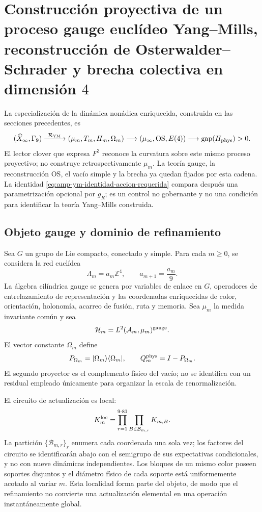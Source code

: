 \section[Proceso gauge euclídeo Yang--Mills en dimensión 4]{Construcción
proyectiva de un proceso gauge euclídeo Yang--Mills, reconstrucción de
Osterwalder--Schrader y brecha colectiva en dimensión \(4\)}


\noindent La especialización de la dinámica nonádica enriquecida,
construida en las secciones precedentes, es
\[
 (\widehat X_\infty,\Gamma_9)
 \xrightarrow{\ \mathcal R_{\rm YM}\ }
 (\mu_m,T_m,H_m,\Omega_m)
 \longrightarrow(\mu_\infty,\mathrm{OS},E(4))
 \longrightarrow\operatorname{gap}(H_{\rm phys})>0.
\]
El lector clover que expresa \(F^2\) reconoce la curvatura sobre este mismo
proceso proyectivo; no construye retrospectivamente \(\mu_m\). La teoría
gauge, la reconstrucción OS, el vacío simple y la brecha ya quedan fijados
por esta cadena. La identidad
\eqref{eq:amp-ym-identidad-accion-requerida} compara después una
parametrización opcional por \(g_R\); es un control no gobernante y no una
condición para identificar la teoría Yang--Mills construida.

\subsection*{Objeto gauge y dominio de refinamiento}

Sea \(G\) un grupo de Lie compacto, conectado y simple. Para cada
\(m\geq0\), se considera la red euclídea
\begin{equation}\label{eq:realizaciones-ym-red}
 \Lambda_m=a_m\mathbb Z^4,
 \qquad a_{m+1}=\frac{a_m}{9}.
\end{equation}
La álgebra cilíndrica gauge se genera por variables de enlace en \(G\),
operadores de entrelazamiento de representación y las coordenadas
enriquecidas de color,
orientación, holonomía, acarreo de fusión, ruta y memoria. Sea \(\mu_m\) la
medida invariante común y sea
\[
 \mathcal H_m=L^2(\mathcal A_m,\mu_m)^{\rm gauge}.
\]
El vector constante \(\Omega_m\) define
\begin{equation}\label{eq:realizaciones-ym-proyectores}
 P_{\Omega_m}=|\Omega_m\rangle\langle\Omega_m|,
 \qquad Q_m^{\rm phys}=I-P_{\Omega_m}.
\end{equation}
El segundo proyector es el complemento físico del vacío; no se identifica
con un residual empleado únicamente para organizar la escala de
renormalización.

El circuito de actualización es local:
\begin{equation}\label{eq:realizaciones-ym-circuito}
 K_m^{\rm loc}
 =\prod_{r=1}^{9\cdot81}
   \prod_{B\in\mathcal B_{m,r}}K_{m,B}.
\end{equation}
La partición \(\{\mathcal B_{m,r}\}_r\) enumera cada coordenada una sola vez; los factores
del circuito se identificarán abajo con el semigrupo de sus expectativas
condicionales, y no con nueve dinámicas independientes.
Los bloques de un mismo color poseen soportes disjuntos y el diámetro físico
de cada soporte está uniformemente acotado al variar \(m\). Esta localidad
forma parte del objeto, de modo que el refinamiento no convierte una
actualización elemental en una operación instantáneamente global.


